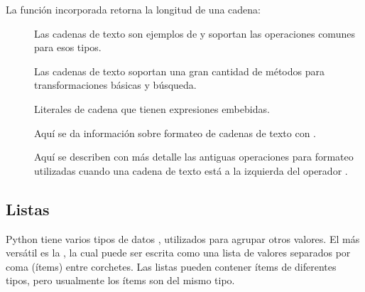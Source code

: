 \documentclass[a4,10pt,spanish]{sphinxmanual}
\begin{document}
\sphinxAtStartPar
La función incorporada  retorna la longitud de una cadena:

\begin{sphinxVerbatim}[commandchars=\\\{\}]
  
\end{sphinxVerbatim}


\nopagebreak

\begin{description}
\item[{}] \leavevmode
\sphinxAtStartPar
Las cadenas de texto son ejemplos de  y soportan las operaciones comunes para esos tipos.

\item[{}] \leavevmode
\sphinxAtStartPar
Las cadenas de texto soportan una gran cantidad de métodos para transformaciones básicas y búsqueda.

\item[{}] \leavevmode
\sphinxAtStartPar
Literales de cadena que tienen expresiones embebidas.

\item[{}] \leavevmode
\sphinxAtStartPar
Aquí se da información sobre formateo de cadenas de texto con .

\item[{}] \leavevmode
\sphinxAtStartPar
Aquí se describen con más detalle las antiguas operaciones para formateo utilizadas cuando una cadena de texto está a la izquierda del operador \sphinxcode{\sphinxupquote{\%}}.

\end{description}




\subsection{Listas}
\label{\detokenize{tutorial/introduction:lists}}\label{\detokenize{tutorial/introduction:tut-lists}}
\sphinxAtStartPar
Python tiene varios tipos de datos , utilizados para agrupar otros valores. El más versátil es la , la cual puede ser escrita como una lista de valores separados por coma (ítems) entre corchetes. Las listas pueden contener ítems de diferentes tipos, pero usualmente los ítems son del mismo tipo.
\end{document}
